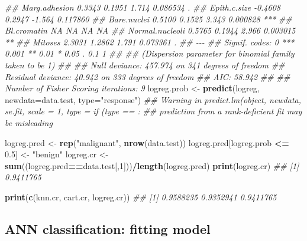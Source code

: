 \documentclass[
]{book}
\newenvironment{Shaded}{\begin{snugshade}}{\end{snugshade}}
\newcommand{\CommentTok}[1]{\textcolor[rgb]{0.56,0.35,0.01}{\textit{#1}}}
\newcommand{\DataTypeTok}[1]{\textcolor[rgb]{0.13,0.29,0.53}{#1}}
\newcommand{\DecValTok}[1]{\textcolor[rgb]{0.00,0.00,0.81}{#1}}
\newcommand{\FloatTok}[1]{\textcolor[rgb]{0.00,0.00,0.81}{#1}}
\newcommand{\KeywordTok}[1]{\textcolor[rgb]{0.13,0.29,0.53}{\textbf{#1}}}
\newcommand{\NormalTok}[1]{#1}
\newcommand{\OperatorTok}[1]{\textcolor[rgb]{0.81,0.36,0.00}{\textbf{#1}}}
\newcommand{\StringTok}[1]{\textcolor[rgb]{0.31,0.60,0.02}{#1}}
\theoremstyle{definition}
\theoremstyle{definition}
\theoremstyle{definition}
\theoremstyle{remark}
\begin{document}
\begin{Shaded}
\begin{Highlighting}[]
\CommentTok{\#\# Marg.adhesion     0.3343     0.1951   1.714 0.086534 .  }
\CommentTok{\#\# Epith.c.size     {-}0.4608     0.2947  {-}1.564 0.117860    }
\CommentTok{\#\# Bare.nuclei       0.5100     0.1525   3.343 0.000828 ***}
\CommentTok{\#\# Bl.cromatin           NA         NA      NA       NA    }
\CommentTok{\#\# Normal.nucleoli   0.5765     0.1944   2.966 0.003015 ** }
\CommentTok{\#\# Mitoses           2.3031     1.2862   1.791 0.073361 .  }
\CommentTok{\#\# {-}{-}{-}}
\CommentTok{\#\# Signif. codes:  0 \textquotesingle{}***\textquotesingle{} 0.001 \textquotesingle{}**\textquotesingle{} 0.01 \textquotesingle{}*\textquotesingle{} 0.05 \textquotesingle{}.\textquotesingle{} 0.1 \textquotesingle{} \textquotesingle{} 1}
\CommentTok{\#\# }
\CommentTok{\#\# (Dispersion parameter for binomial family taken to be 1)}
\CommentTok{\#\# }
\CommentTok{\#\#     Null deviance: 457.974  on 341  degrees of freedom}
\CommentTok{\#\# Residual deviance:  40.942  on 333  degrees of freedom}
\CommentTok{\#\# AIC: 58.942}
\CommentTok{\#\# }
\CommentTok{\#\# Number of Fisher Scoring iterations: 9}
\NormalTok{logreg.prob \textless{}{-}}\StringTok{ }\KeywordTok{predict}\NormalTok{(logreg, }\DataTypeTok{newdata=}\NormalTok{data.test, }\DataTypeTok{type=}\StringTok{"response"}\NormalTok{)}
\CommentTok{\#\# Warning in predict.lm(object, newdata, se.fit, scale = 1, type = if (type == :}
\CommentTok{\#\# prediction from a rank{-}deficient fit may be misleading}

\NormalTok{logreg.pred \textless{}{-}}\StringTok{ }\KeywordTok{rep}\NormalTok{(}\StringTok{"malignant"}\NormalTok{, }\KeywordTok{nrow}\NormalTok{(data.test))}
\NormalTok{logreg.pred[logreg.prob }\OperatorTok{\textless{}=}\StringTok{ }\FloatTok{0.5}\NormalTok{] \textless{}{-}}\StringTok{ "benign"}
\NormalTok{logreg.cr \textless{}{-}}\StringTok{ }\KeywordTok{sum}\NormalTok{((logreg.pred}\OperatorTok{==}\NormalTok{data.test[,}\DecValTok{1}\NormalTok{]))}\OperatorTok{/}\KeywordTok{length}\NormalTok{(logreg.pred)}
\KeywordTok{print}\NormalTok{(logreg.cr)}
\CommentTok{\#\# [1] 0.9411765}

\KeywordTok{print}\NormalTok{(}\KeywordTok{c}\NormalTok{(knn.cr, cart.cr, logreg.cr))}
\CommentTok{\#\# [1] 0.9588235 0.9352941 0.9411765}
\end{Highlighting}
\end{Shaded}

\hypertarget{ann-classification-fitting-model}{%
\subsection{ANN classification: fitting model}\label{ann-classification-fitting-model}}
\end{document}
